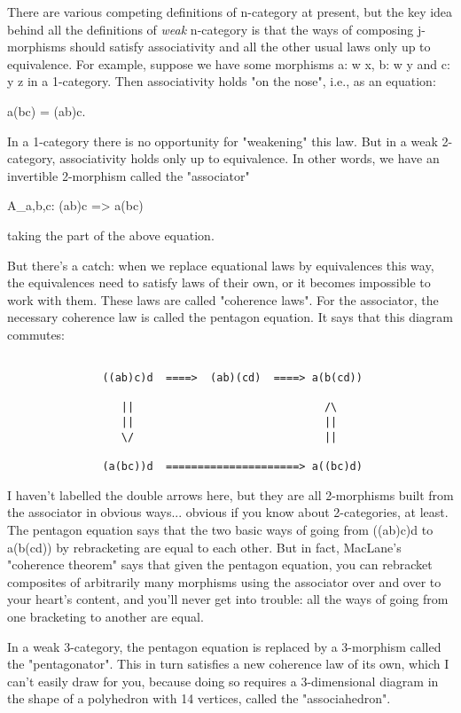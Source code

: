 There are various competing definitions of n-category at present, but
the key idea behind all the definitions of \emph{weak} n-category is that the
ways of composing j-morphisms should satisfy associativity and all the
other usual laws only up to equivalence.  For example, suppose we have
some morphisms a: w \to  x, b: w \to  y and c: y \to  z in a
1-category.  Then associativity holds "on the nose", i.e., as
an equation:

a(bc) = (ab)c.

In a 1-category there is no opportunity for "weakening" this
law.  But in a weak 2-category, associativity holds only up to
equivalence.  In other words, we have an invertible 2-morphism called
the "associator"

A_{a,b,c}: (ab)c => a(bc)

taking the part of the above equation.  

But there's a catch: when we replace equational laws by equivalences
this way, the equivalences need to satisfy laws of their own, or it
becomes impossible to work with them.  These laws are called
"coherence laws".  For the associator, the necessary coherence
law is called the pentagon equation.  It says that this diagram
commutes:


\begin{verbatim}

               ((ab)c)d  ====>  (ab)(cd)  ====> a(b(cd))

                  ||                              /\
                  ||                              ||
                  \/                              ||

               (a(bc))d  =====================> a((bc)d)
\end{verbatim}
    
I haven't labelled the double arrows here, but they are all 2-morphisms
built from the associator in obvious ways... obvious if you know about
2-categories, at least.  The pentagon equation says that the two basic
ways of going from ((ab)c)d to a(b(cd)) by rebracketing are equal to
each other.  But in fact, MacLane's "coherence theorem" says
that given the pentagon equation, you can rebracket composites of
arbitrarily many morphisms using the associator over and over to your
heart's content, and you'll never get into trouble: all the ways of
going from one bracketing to another are equal.

In a weak 3-category, the pentagon equation is replaced by a 3-morphism
called the "pentagonator".  This in turn satisfies a new coherence
law of its own, which I can't easily draw for you, because doing so 
requires a 3-dimensional diagram in the shape of a polyhedron with 14
vertices, called the "associahedron".  

